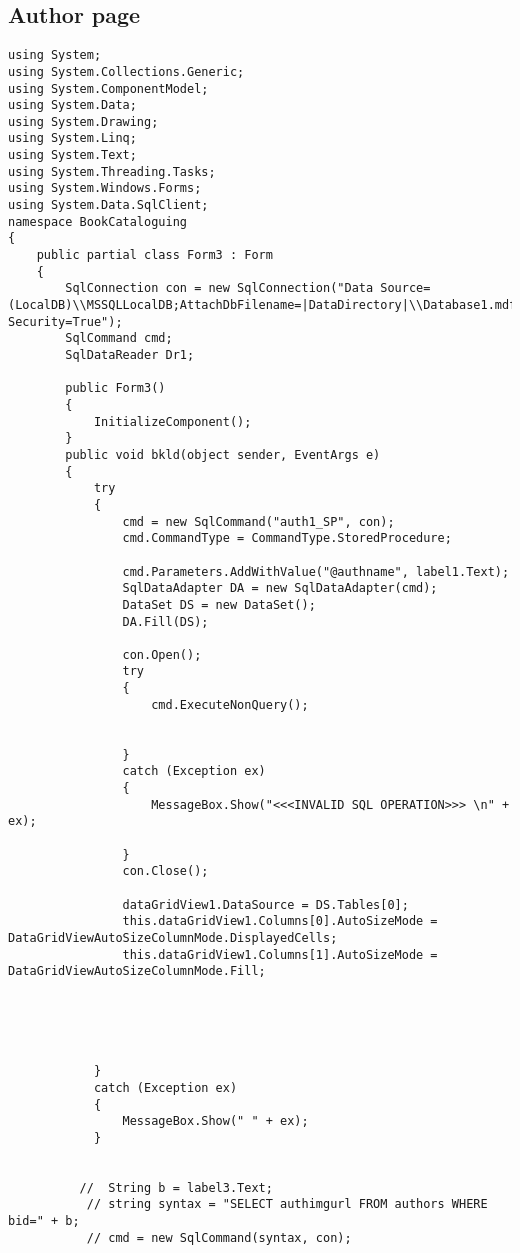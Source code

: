 \subsection{Author page}
\begin{lstlisting}
using System;
using System.Collections.Generic;
using System.ComponentModel;
using System.Data;
using System.Drawing;
using System.Linq;
using System.Text;
using System.Threading.Tasks;
using System.Windows.Forms;
using System.Data.SqlClient;
namespace BookCataloguing
{
    public partial class Form3 : Form
    {
        SqlConnection con = new SqlConnection("Data Source=(LocalDB)\\MSSQLLocalDB;AttachDbFilename=|DataDirectory|\\Database1.mdf;Integrated Security=True");
        SqlCommand cmd;
        SqlDataReader Dr1;

        public Form3()
        {
            InitializeComponent();
        }
        public void bkld(object sender, EventArgs e)
        {
            try
            {
                cmd = new SqlCommand("auth1_SP", con);
                cmd.CommandType = CommandType.StoredProcedure;

                cmd.Parameters.AddWithValue("@authname", label1.Text);
                SqlDataAdapter DA = new SqlDataAdapter(cmd);
                DataSet DS = new DataSet();
                DA.Fill(DS);

                con.Open();
                try
                {
                    cmd.ExecuteNonQuery();


                }
                catch (Exception ex)
                {
                    MessageBox.Show("<<<INVALID SQL OPERATION>>> \n" + ex);

                }
                con.Close();

                dataGridView1.DataSource = DS.Tables[0];
                this.dataGridView1.Columns[0].AutoSizeMode = DataGridViewAutoSizeColumnMode.DisplayedCells;
                this.dataGridView1.Columns[1].AutoSizeMode = DataGridViewAutoSizeColumnMode.Fill;
               




            }
            catch (Exception ex)
            {
                MessageBox.Show(" " + ex);
            }
            

          //  String b = label3.Text;
           // string syntax = "SELECT authimgurl FROM authors WHERE bid=" + b; 
           // cmd = new SqlCommand(syntax, con);



\end{lstlisting}
